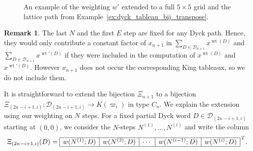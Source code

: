 \documentclass[11pt, leqno]{amsart}
\theoremstyle{plain}
\theoremstyle{definition}
\newtheorem{remark}[theorem]{Remark}
\numberwithin{equation}{section}
\newcommand{\fw}{\varpi} %
\newcommand{\Dyck}{\mathcal{D}} %
\newcommand{\wt}{\operatorname{wt}} %
\newcommand{\ofour}{\overline{4}}
\newcommand{\othree}{\overline{3}}
\newcommand{\otwo}{\overline{2}}
\newcommand{\one}{\overline{1}}
\begin{document}
\begin{figure}
\caption{An example of the weighting $w'$ extended to a full $5 \times 5$ grid and the lattice path from Example~\ref{ex:dyck_tableau_bij_transpose}.}
\label{fig:Dyck_statistic_transpose}
\end{figure}

\begin{remark}
\label{rem:removed_fixed}
The last $N$ and the first $E$ step are fixed for any Dyck path. Hence, they would only contribute a constant factor of $x_{n+1}$ in $\sum_{D \in \Dyck_{n+1}} x^{\wt(D)}$ and $\sum_{D \in \Dyck_{n+1}} x^{\wt'(D)}$ if they were included in the computation of $x^{\wt(D)}$ and $x^{\wt'(D)}$. However $x_{n+1}$ does not occur the corresponding King tableaux, so we do not include them.
\end{remark}

It is straightforward to extend the bijection $\Xi_{n+1}$ to a bijection $\Xi_{(2n-i+1,i)} \colon \Dyck_{(2n-i+1,i)} \to K(\fw_i)$ in type $C_n$.
We explain the extension using our weighting on $N$ steps.
For a fixed partial Dyck word $D \in \Dyck_{(2n-i+1,i)}$ starting at $(0,0)$, we consider the $N$-steps $N^{(1)}, \dotsc, N^{(i)}$ and write the column
\[
\Xi_{(2n-i+1,i)}(D) = \begin{array}{|c|c|c|c|c|}
\hline
w(N^{(1)};D) & w(N^{(2)};D) & \cdots & w(N^{(i-1)};D) & w(N^{(i)};D)
\\\hline
\end{array}^{\,T}.
\]
\end{document}
